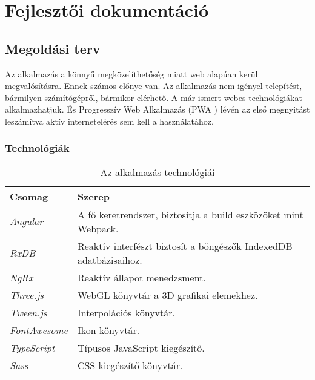 \chapter{Fejlesztői dokumentáció}
\label{ch:impl}

\section{Megoldási terv}

Az alkalmazás a könnyű megközelíthetőség miatt web alapúan kerül megvalósításra. Ennek számos előnye van. Az alkalmazás nem igényel telepítést, bármilyen számítógépről, bármikor elérhető. A már ismert webes technológiákat alkalmazhatjuk. És Progresszív Web Alkalmazás (PWA \cite{PWA}) lévén az első megnyitást leszámítva aktív internetelérés sem kell a használatához.

\subsection{Technológiák}

\begin{table}[H]
	\centering
	\begin{tabular}{ | m{} | m{} | }
		\hline
		\textbf{Csomag} & \textbf{Szerep} \\
		\hline \hline
		\emph{Angular} \cite{Angular} & A fő keretrendszer, biztosítja a build eszközöket mint Webpack. \\
		\hline
		\emph{RxDB} \cite{RxDB} & Reaktív interfészt biztosít a böngészők IndexedDB adatbázisaihoz. \\
		\hline
		\emph{NgRx} \cite{NgRx} & Reaktív állapot menedzsment. \\
		\hline
		\emph{Three.js} \cite{Three} & WebGL könyvtár a 3D grafikai elemekhez. \\
		\hline
		\emph{Tween.js} \cite{Tween} & Interpolációs könyvtár. \\
		\hline
		\emph{FontAwesome} \cite{FontAwesome} & Ikon könyvtár.  \\
		\hline
		\emph{TypeScript} \cite{TypeScript} & Típusos JavaScript kiegészítő.  \\
		\hline

		\emph{Sass} \cite{Sass} & CSS kiegészítő könyvtár.  \\
		\hline
	\end{tabular}
	\caption{Az alkalmazás technológiái}
	\label{tab:technologies}
\end{table}



